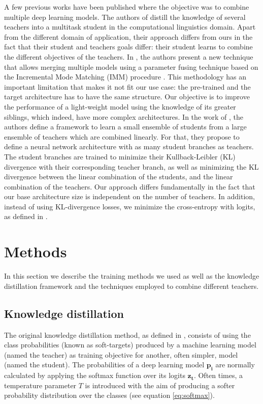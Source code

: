 \documentclass{elsarticle}
\begin{document}
	A few previous works have been published where the objective was to combine multiple deep learning models. The authors of \cite{liu2020} distill the knowledge of several teachers into a multitask student in the computational linguistics domain. Apart from the different domain of application, their approach differs from ours in the fact that their student and teachers goals differ: their student learns to combine the different objectives of the teachers. In \cite{geyer2019}, the authors present a new technique that allows merging multiple models using a parameter fusing technique based on the Incremental Mode Matching (IMM) procedure \cite{lee2017}. This methodology has an important limitation that makes it not fit our use case: the pre-trained and the target architecture has to have the same structure. Our objective is to improve the performance of a light-weight model using the knowledge of its greater siblings, which indeed, have more complex architectures. In the work of \cite{asif2019}, the authors define a framework to learn a small ensemble of students from a large ensemble of teachers which are combined linearly. For that, they propose to define a neural network architecture with as many student branches as teachers. The student branches are trained to minimize their Kullback-Leibler (KL) divergence with their corresponding teacher branch, as well as minimizing the KL divergence between the linear combination of the students, and the linear combination of the teachers. Our approach differs fundamentally in the fact that our base architecture size is independent on the number of teachers. In addition, instead of using KL-divergence losses, we minimize the cross-entropy with logits, as defined in \cite{hinton2015}.
	
	\section{Methods}
	In this section we describe the training methods we used as well as the knowledge distillation framework and the techniques employed to combine different teachers.
	
	\subsection{Knowledge distillation}
	The original knowledge distillation method, as defined in \cite{hinton2015}, consists of using the class probabilities (known as soft-targets) produced by a machine learning model (named the teacher) as training objective for another, often simpler, model (named the student). The probabilities of a deep learning model $\mathbf{p_i}$ are normally calculated by applying the softmax function over its logits $\mathbf{z_t}$. Often times, a temperature parameter $T$ is introduced with the aim of producing a softer probability distribution over the classes (see equation \ref{eq:softmax}).
	
\end{document}

